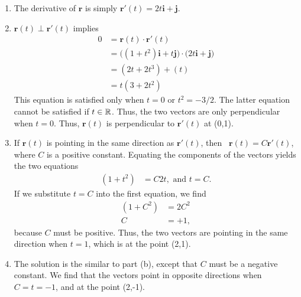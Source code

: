 \documentclass{article}
\begin{document}
\begin{enumerate}
\item The derivative of $\textbf{r}$ is simply
\(
  \mathbf{r}'(t) = 2t \mathbf{i} + \mathbf{j}.
\)

\BEN
\item \(
  \mathbf{r}(t) \perp  \mathbf{r}'(t)
\)
implies
\begin{align*}
  0& = \mathbf{r}(t) \cdot  \mathbf{r}'(t) \\
  &= \big((1+t^2) \mathbf{i} + t\mathbf{j} \big) \cdot \big(2t \mathbf{i} + \mathbf{j}\big) \\
  &= (2t+2t^3) + (t)\\
  &= t(3+2t^2)
\end{align*}
This equation is satisfied only when $t=0$ or $t^2 = -3/2$. The latter equation cannot be satisfied if $t\in\mathbb{R}$. Thus, the two vectors are only perpendicular when $t=0$. Thus,  \(\mathbf{r}(t)\) is perpendicular to \(\mathbf{r}'(t)\) at (0,1). 
\item If \(\mathbf{r}(t)\) is pointing in the same direction as \(\mathbf{r}'(t)\), then \ \(\mathbf{r}(t) = C  \mathbf{r}'(t)\), where $C$ is a positive constant. Equating the components of the vectors yields the two equations
\begin{align*}
  (1+t^2)& = C2t , \text{ and } t=C.
\end{align*}
If we substitute $t=C$ into the first equation, we find
\begin{align*}
  (1+C^2)& = 2C^2\\
  C&=+1,
\end{align*}
because $C$ must be positive. Thus, the two vectors are pointing in the same direction when $t=1$, which is at the point (2,1).
\item
The solution is the similar to part (b), except that $C$ must be a negative constant. We find that the vectors point in opposite directions when $C=t=-1$, and at the point (2,-1).
\EEN


\end{enumerate}
\end{document}
